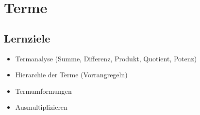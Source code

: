 
\section{Terme}

\subsection*{Lernziele}

\begin{itemize}
 \item Termanalyse (Summe, Differenz, Produkt, Quotient, Potenz)
 \item Hierarchie der Terme (Vorrangregeln)
 \item Termumformungen
 \item Ausmultiplizieren
\end{itemize}
\newpage


